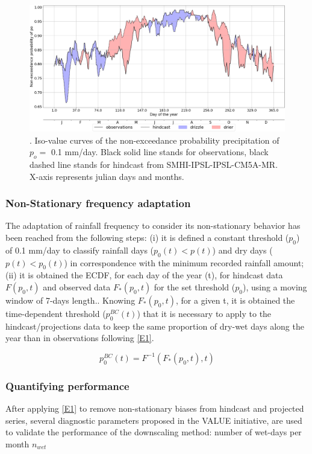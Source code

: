 \documentclass[a4paper,11pt]{article}
\begin{document}
\begin{figure}[H]  %
\centering
\includegraphics[scale=0.26]{Fig1.PNG}
\caption{. Iso-value curves of the non-exceedance probability precipitation of $p_{o}=$ 0.1 mm/day. Black solid line stands for observations, black dashed line stands for hindcast from SMHI-IPSL-IPSL-CM5A-MR. X-axis represents julian days and months. }
\label{F1}
\end{figure}


\subsubsection{Non-Stationary frequency adaptation} 
The adaptation of rainfall frequency to consider its non-stationary behavior has been reached from the following steps: (i) it is defined a constant threshold ($p_{0}$) of 0.1 mm/day to classify rainfall days ($p_{0}(t) < p(t)$) and dry days ($p(t) < p_{0}(t)$) in correspondence with the minimum recorded rainfall amount; (ii) it is obtained the ECDF, for each day of the year (t), for hindcast data $F(p_{0}  ,t)$ and observed data $F_{*} (p_{0}  ,t)$ for the set threshold ($p_{0}$), using a moving window of 7-days length.. Knowing $F_{*}(p_{0},t)$,  for a given t, it is obtained the time-dependent threshold ($p_0^{BC}(t)$) that it is necessary to apply to the hindcast/projections data to keep the same proportion of dry-wet days along the year than in observations following \ref{E1}.

\begin{equation}
p_0^{BC}(t) = F^{-1}(F_*(p_0,t),t)
\label{E1}
\end{equation}

\subsubsection{Quantifying performance} 
After applying \ref{E1} to remove non-stationary biases from hindcast and projected series, several diagnostic parameters proposed in the VALUE initiative, are used to validate the performance of the downscaling method: number of wet-days per month $n_{wet}$
\end{document}
